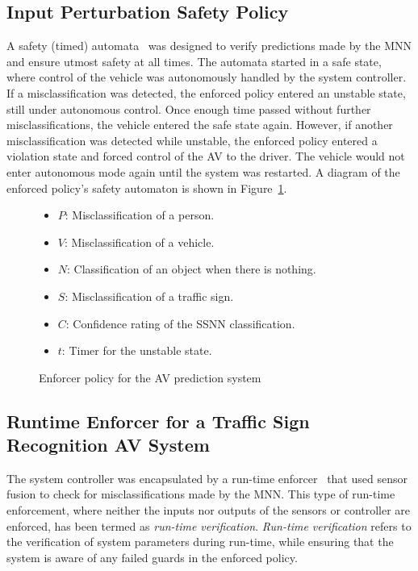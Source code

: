 \subsection{Input Perturbation Safety Policy}
A safety (timed) automata~\cite{recps} was designed to verify predictions made by the \ac{MNN} and ensure utmost safety at all times.
The automata started in a safe state, where control of the vehicle was autonomously handled by the system controller.
If a misclassification was detected, the enforced policy entered an unstable state, still under autonomous control. 
Once enough time passed without further misclassifications, the vehicle entered the safe state again.
However, if another misclassification was detected while unstable, the enforced policy entered a violation state and forced control of the \ac{AV} to the driver.
The vehicle would not enter autonomous mode again until the system was restarted.
A diagram of the enforced policy's safety automaton is shown in Figure~\ref{fig:signrte}.
\begin{figure}[t]
	\centering
	\scalebox{1.3}{}
	\begin{itemize}
		\item $P$: Misclassification of a person.
		\item $V$: Misclassification of a vehicle.
		\item $N$: Classification of an object when there is nothing.
		\item $S$: Misclassification of a traffic sign.
		\item $C$: Confidence rating of the \ac{SSNN} classification.
		\item $t$: Timer for the unstable state.
	\end{itemize}
	
	\caption{Enforcer policy for the \acf{AV} prediction system}
	\label{fig:signrte}
\end{figure}

\subsection{Runtime Enforcer for a Traffic Sign Recognition AV System}
The system controller was encapsulated by a run-time enforcer~\cite{recps} that used sensor fusion to check for misclassifications made by the \ac{MNN}.
This type of run-time enforcement, where neither the inputs nor outputs of the sensors or controller are enforced, has been termed as \textit{run-time verification}.
\textit{Run-time verification} refers to the verification of system parameters during run-time, while ensuring that the system is aware of any failed guards in the enforced policy.

